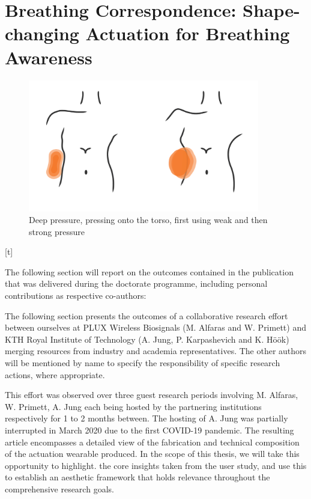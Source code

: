 
\section{Breathing Correspondence: Shape-changing Actuation for Breathing Awareness}
\label{case_studies:soma_chi}

\begin{figure}[t]
  \centering  
  \includegraphics[width=0.9\textwidth]{Chapters/Figures/soma_chi/deep_pressure_graphic-01.png}
  \caption{Deep pressure, pressing onto the torso, first using weak and then strong pressure}
  \label{fig:teaser}
\end{figure}[t]

The following section will report on the outcomes contained in the publication that was delivered during the doctorate programme, including personal contributions as respective co-authors: 


The following section presents the outcomes of a collaborative research effort between ourselves at PLUX Wireless Biosignals (M. Alfaras and W. Primett) and KTH Royal Institute of Technology (A. Jung, P. Karpashevich and K. Höök) merging resources from industry and academia representatives. The other authors will be mentioned by name to specify the responsibility of specific research actions, where appropriate.

This effort was observed over three guest research periods involving M. Alfaras, W. Primett, A. Jung each being hosted by the partnering institutions respectively for 1 to 2 months between. The hosting of A. Jung was partially interrupted in March 2020 due to the first COVID-19 pandemic. The resulting article encompasses a detailed view of the fabrication and technical composition of the actuation wearable produced. In the scope of this thesis, we will take this opportunity to highlight. the core insights taken from the user study, and use this to establish an aesthetic framework that holds relevance throughout the comprehensive research goals.

